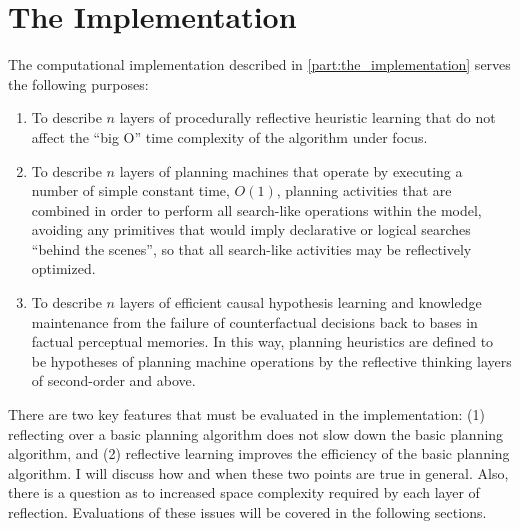 




\section{The Implementation}

The computational implementation described in
{\mbox{\autoref{part:the_implementation}}} serves the following
purposes:
\begin{enumerate}
\item To describe $n$ layers of procedurally reflective heuristic
  learning that do not affect the ``big O'' time complexity of the
  algorithm under focus.
\item To describe $n$ layers of planning machines that operate by
  executing a number of simple constant time, $O(1)$, planning
  activities that are combined in order to perform all search-like
  operations within the model, avoiding any primitives that would
  imply declarative or logical searches ``behind the scenes'', so that
  all search-like activities may be reflectively optimized.
\item To describe $n$ layers of efficient causal hypothesis learning
  and knowledge maintenance from the failure of counterfactual
  decisions back to bases in factual perceptual memories.  In this
  way, planning heuristics are defined to be hypotheses of planning
  machine operations by the reflective thinking layers of second-order
  and above.
\end{enumerate}
There are two key features that must be evaluated in the
implementation: (1) reflecting over a basic planning algorithm does
not slow down the basic planning algorithm, and (2) reflective
learning improves the efficiency of the basic planning algorithm.  I
will discuss how and when these two points are true in general.  Also,
there is a question as to increased space complexity required by each
layer of reflection.  Evaluations of these issues will be covered in
the following sections.


